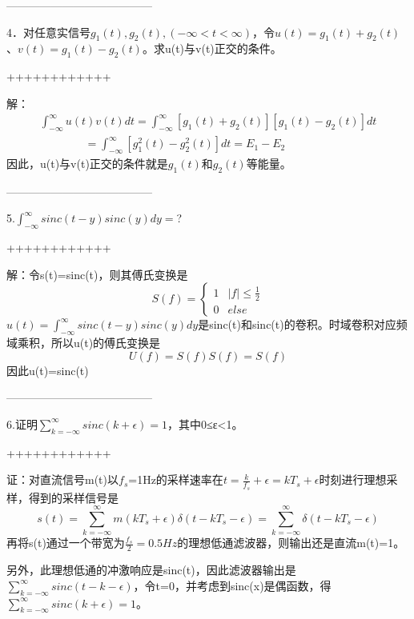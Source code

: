 \documentclass[utf8]{article}
\begin{document}
---------------------------------------

4．对任意实信号$g_{1} \left( t \right),g_{2} \left( t \right),\left(- \infty<t< \infty \right)$，令$u \left( t \right)=g_{1} \left( t \right)+g_{2} \left( t \right)$、$v \left( t \right)=g_{1} \left( t \right)-g_{2} \left( t \right)$。求u(t)与v(t)正交的条件。

++++++++++++

解：
$$\begin{array}{c}\int_{-\infty}^{\infty} u \left( t \right) v \left( t \right) dt= \int_{-\infty}^{ \infty} \left[ g_{1} \left( t \right)+g_{2} \left( t \right) \right] \left[ g_{1} \left( t \right)-g_{2} \left( t \right) \right] dt \\ \qquad \qquad= \int_{-\infty}^{ \infty} \left[ g_{1}^{2} \left( t \right)-g_{2}^{2} \left( t \right) \right] dt=E_{1}-E_{2}\end{array}$$
因此，u(t)与v(t)正交的条件就是$g_{1}\left(t\right)$和$g_{2}\left(t\right)$等能量。 

---------------------------------------

5.$\int_{-\infty}^{\infty}sinc(t-y)sinc(y)dy =$?

++++++++++++

解：令s(t)=sinc(t)，则其傅氏变换是
$$S \left( f \right)= \left \{ \begin{matrix} 1& \left| f \right| \leq \frac{1}{2} \\ 0&else \end{matrix} \right.$$
$u \left( t \right)= \int_{- \infty}^{ \infty} sinc \left( t-y \right) sinc \left( y \right) dy$是sinc(t)和sinc(t)的卷积。时域卷积对应频域乘积，所以u(t)的傅氏变换是
$$U \left( f \right)=S \left( f \right) S \left( f \right)=S \left( f \right)$$
因此u(t)=sinc(t)

---------------------------------------

6.证明$\sum_{k=- \infty}^{ \infty} sinc \left( k+ \epsilon \right)=1$，其中0≤ε<1。

++++++++++++

证：对直流信号m(t)以$f_{s}$=1Hz的采样速率在$t= \frac{k}{f_{s}}+ \epsilon=kT_{s}+ \epsilon$时刻进行理想采样，得到的采样信号是
$$s \left( t \right)= \sum_{k=- \infty}^{ \infty}m \left( kT_{s}+ \epsilon \right) \delta \left( t-kT_{s}- \epsilon \right)= \sum_{k=- \infty}^{ \infty} \delta \left( t-kT_{s}- \epsilon \right)$$
再将s(t)通过一个带宽为$\frac{f_{s}}{2}=0.5Hz$的理想低通滤波器，则输出还是直流m(t)=1。

另外，此理想低通的冲激响应是sinc(t)，因此滤波器输出是$\sum_{k=- \infty}^{ \infty} sinc \left( t-k- \epsilon \right)$，令t=0，并考虑到sinc(x)是偶函数，得$\sum_{k=- \infty}^{ \infty} sinc \left( k+ \epsilon \right)=1$。
\end{document}
